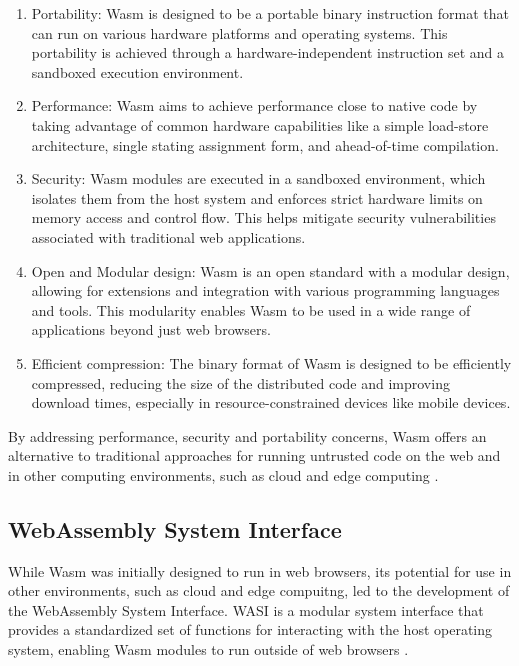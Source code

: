 \documentclass[
  table]{report}
\providecommand{\tightlist}{%
  \setlength{\itemsep}{0pt}\setlength{\parskip}{0pt}}
\begin{document}
\begin{enumerate}
\def\labelenumi{\arabic{enumi}.}
\tightlist
\item
  Portability: \ac{Wasm} is designed to be a portable binary instruction
  format that can run on various hardware platforms and operating
  systems. This portability is achieved through a hardware-independent
  instruction set and a sandboxed execution environment.
\item
  Performance: \ac{Wasm} aims to achieve performance close to native
  code by taking advantage of common hardware capabilities like a simple
  load-store architecture, single stating assignment form, and
  ahead-of-time compilation.
\item
  Security: \ac{Wasm} modules are executed in a sandboxed environment,
  which isolates them from the host system and enforces strict hardware
  limits on memory access and control flow. This helps mitigate security
  vulnerabilities associated with traditional web applications.
\item
  Open and Modular design: \ac{Wasm} is an open standard with a modular
  design, allowing for extensions and integration with various
  programming languages and tools. This modularity enables \ac{Wasm} to
  be used in a wide range of applications beyond just web browsers.
\item
  Efficient compression: The binary format of \ac{Wasm} is designed to
  be efficiently compressed, reducing the size of the distributed code
  and improving download times, especially in resource-constrained
  devices like mobile devices.
\end{enumerate}

By addressing performance, security and portability concerns, \ac{Wasm}
offers an alternative to traditional approaches for running untrusted
code on the web and in other computing environments, such as cloud and
edge computing \citep{haasBringingWebSpeed2017}.

\subsection{WebAssembly System Interface}

While \ac{Wasm} was initially designed to run in web browsers, its
potential for use in other environments, such as cloud and edge
compuitng, led to the development of the WebAssembly System Interface.
\ac{WASI} is a modular system interface that provides a standardized set
of functions for interacting with the host operating system, enabling
\ac{Wasm} modules to run outside of web browsers \citep{WASIDev}.
\end{document}
